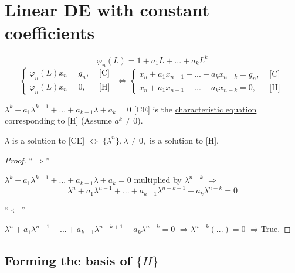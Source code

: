 \documentclass[twoside]{article}
\newcommand\imp{$\Longrightarrow$}
\begin{document}
\section{Linear DE with constant coefficients}
\begin{equation}
    \varphi_{n}(L) = 1 + a_{1}L + ... + a_{k}L^{k}
\end{equation}
\[
\begin{cases}
    \varphi_{n}(L)x_{n} = g_{n}, &\text{ [C] }\\
    \varphi_{n}(L)x_{n} = 0    , &\text{ [H] }
\end{cases}
\iff
\begin{cases}
    x_n + a_{1}x_{n-1}+ ...+ a_{k} x_{n-k} = g_{n}, &\text{ [C] }\\
    x_n + a_{1}x_{n-1}+ ...+ a_{k} x_{n-k} = 0    , &\text{ [H] }    
\end{cases}
\]

\begin{definition}
    $\lambda^{k} + a_{1} \lambda^{k-1} + ... + a_{k-1} \lambda + a_{k} = 0$ [CE] is the \underline{characteristic equation} corresponding to [H] (Assume $a^{k} \neq 0$).
\end{definition}

\begin{theorem}
    $\lambda$ is a solution to [CE] $\iff$ $\{ \lambda^{n} \}, \lambda \neq 0,$ is a solution to [H].
\end{theorem}
\begin{proof}
    ``\imp''

    $\lambda^{k} + a_{1} \lambda^{k-1} + ... + a_{k-1} \lambda + a_{k} = 0$ multiplied by $\lambda^{n-k}$ \imp 
    \[
    \lambda^{n} + a_{1} \lambda^{n-1} + ... + a_{k-1} \lambda^{n-k+1} + a_{k} \lambda^{n-k} = 0
    \]

    ``$\Longleftarrow$''

    $\lambda^{n} + a_{1} \lambda^{n-1} + ... + a_{k-1} \lambda^{n-k+1} + a_{k} \lambda^{n-k} = 0$ \imp $\lambda^{n-k} (...) = 0$ \imp True.
\end{proof}

\subsection*{Forming the basis of $\{H\}$}
\end{document}
